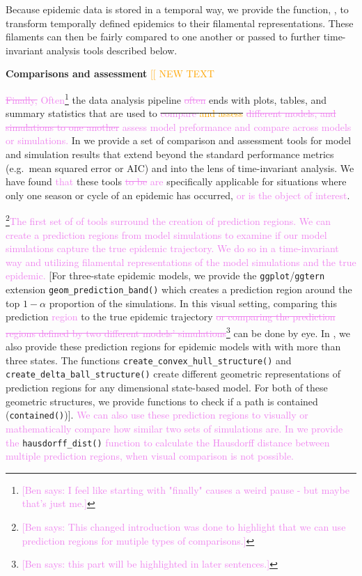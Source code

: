 \documentclass[
  shortnames]{jss}
\begin{document}
Because epidemic data is stored in a temporal way, we provide the
function, , to transform temporally defined
epidemics to their filamental representations. These filaments can then
be fairly compared to one another or passed to further time-invariant
analysis tools described below.

\textbf{Comparisons and assessment} \textcolor{orange}{[[ NEW TEXT}

\textcolor{violet}{\sout{Finally,} Often}\footnote{\textcolor{violet}{[Ben says: I feel like starting with "finally" causes a weird pause - but maybe that's just me.]}}
the data analysis pipeline \textcolor{violet}{\sout{often}} ends with
plots, tables, and summary statistics that are used to
\sout{\textcolor{violet}{compare} \textcolor{orange}{and assess}}
\textcolor{violet}{\sout{different models, and simulations to one another} assess model preformance and compare across models or simulations.}
In  we provide a set of comparison and assessment tools
for model and simulation results that extend beyond the standard
performance metrics (e.g.~mean squared error or AIC) and into the lens
of time-invariant analysis. We have found \textcolor{violet}{that} these
tools \textcolor{violet}{\sout{to be} are} specifically applicable for
situations where only one season or cycle of an epidemic has occurred,
\textcolor{violet}{or is the object of interest}.

\footnote{\textcolor{violet}{[Ben says: This changed introduction was done to highlight that we can use prediction regions for mutiple types of comparisons.]}}\textcolor{violet}{The first set of of tools surround the creation of prediction regions. We can create a prediction regions from model simulations to examine if our model simulations capture the true epidemic trajectory. We do so in a time-invariant way and utilizing filamental representations of the model simulations and the true epidemic.}
{[}For three-state epidemic models, we provide the
\texttt{ggplot}/\texttt{ggtern} extension
\texttt{geom\_prediction\_band()} which creates a prediction region
around the top \(1-\alpha\) proportion of the simulations. In this
visual setting, comparing this prediction \textcolor{violet}{region} to
the true epidemic trajectory
\textcolor{violet}{\sout{or comparing the prediction regions defined by two different models' simulations}}\footnote{\textcolor{violet}{[Ben says: this part will be highlighted in later sentences.]}}
can be done by eye. In , we also provide these
prediction regions for epidemic models with with more than three states.
The functions \texttt{create\_convex\_hull\_structure()} and
\texttt{create\_delta\_ball\_structure()} create different geometric
representations of prediction regions for any dimensional state-based
model. For both of these geometric structures, we provide functions to
check if a path is contained (\texttt{contained()}){]}.
\textcolor{violet}{We can also use these prediction regions to visually or mathematically compare how similar two sets of simulations are. In  we provide the}
\texttt{hausdorff\_dist()}
\textcolor{violet}{function to calculate the Hausdorff distance between multiple prediction regions, when visual comparison is not possible.}
\end{document}
